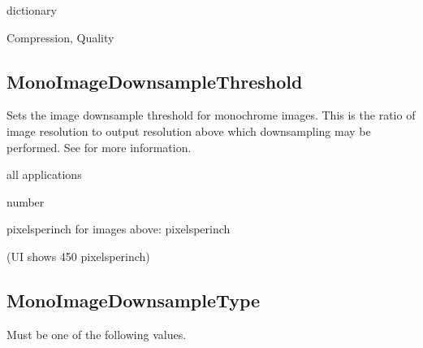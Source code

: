 \documentclass[letterpaper,12pt,english,openany,oneside]{sphinxmanual}
\begin{document}
dictionary

\label{\detokenize{PDF_Create_CommonSettings:ui-name-45}}

Compression, Quality

\label{\detokenize{PDF_Create_CommonSettings:default-value-55}}

\begin{sphinxVerbatim}[commandchars=\\\{\}]
   
\end{sphinxVerbatim}




\subsection{MonoImageDownsampleThreshold}
\label{\detokenize{PDF_Create_CommonSettings:monoimagedownsamplethreshold}}
Sets the image downsample threshold for monochrome images. This is the ratio of image resolution to output resolution above which downsampling may be performed. See  for more information.

\label{\detokenize{PDF_Create_CommonSettings:supported-by-60}}

all applications

\label{\detokenize{PDF_Create_CommonSettings:type-60}}

number

\label{\detokenize{PDF_Create_CommonSettings:ui-name-46}}

pixels\sphinxhyphen{}per\sphinxhyphen{}inch for images above:  pixels\sphinxhyphen{}per\sphinxhyphen{}inch

\label{\detokenize{PDF_Create_CommonSettings:default-value-56}}

 (UI shows 450 pixels\sphinxhyphen{}per\sphinxhyphen{}inch)




\subsection{MonoImageDownsampleType}
\label{\detokenize{PDF_Create_CommonSettings:monoimagedownsampletype}}
Must be one of the following values.
\end{document}
